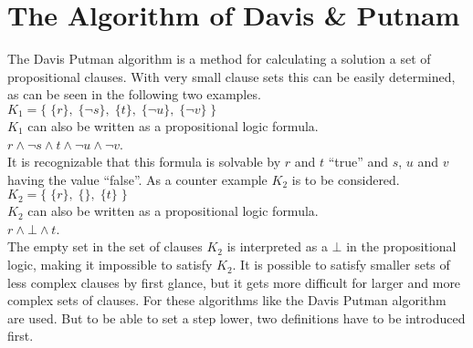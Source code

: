 \section{The Algorithm of Davis \& Putnam}
\label{sec:sciDavisPutnam}
The Davis Putman algorithm is a method for calculating a solution a set of propositional clauses. With very small clause sets this can be easily determined, as can be seen in the following two examples.
\\[0.2cm]
\hspace*{1.3cm} $K_1 = \bigl\{\; \{r\},\; \{\neg s\},\; \{t\},\; \{\neg u\}, \; \{\neg v\} \;\bigr\}$ 
\\[0.2cm]
$K_1$
can also be written as a propositional logic formula.
\\[0.2cm]
\hspace*{1.3cm} $r \land \neg s \land t \land \neg u \land \neg v$.
\\[0.2cm]
It is recognizable that this formula is solvable by $r$ and $t$ \enquote{true} and $s$, $u$ and $v$ having the value \enquote{false}.
As a counter example $K_2$ is to be considered.
\\
\hspace*{1.3cm} $K_2 = \bigl\{\; \{r\},\; \{\},\; \{t\} \;\bigr\}$ 
\\[0.2cm]
$K_2$ can also be written as a propositional logic formula.
\\[0.2cm]
\hspace*{1.3cm}
$r \land \bot \land t$.
\\[0.2cm]
The empty set in the set of clauses $K_2$ is interpreted as a $\bot$ in the propositional logic, making it impossible to satisfy $K_2$. It is possible to satisfy smaller sets of less complex clauses by first glance, but it gets more difficult for larger and more complex sets of clauses. For these algorithms like the Davis Putman algorithm are used.
But to be able to set a step lower, two definitions have to be introduced first. \cite{Zhang2000}

